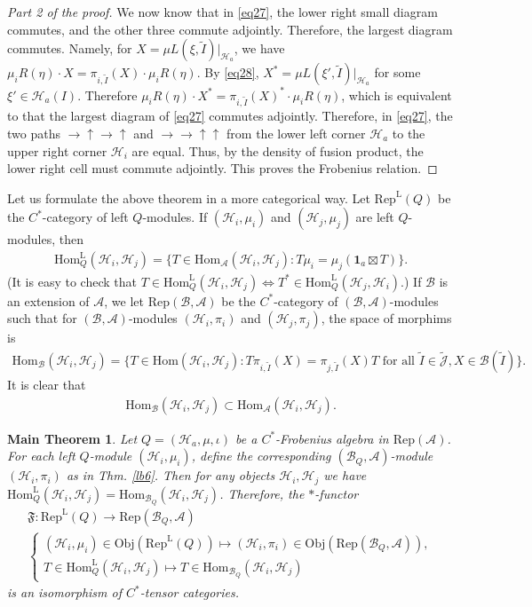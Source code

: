 \documentclass[11pt,b5paper,notitlepage]{article}
\theoremstyle{definition}
\theoremstyle{plain}
\newtheorem{Mthm}{Main Theorem}
\newcommand{\fk}{\mathfrak}
\newcommand{\mc}{\mathcal}
\newcommand{\wtd}{\widetilde}
\newcommand{\id}{\mathbf{1}}
\newcommand{\Hom}{\mathrm{Hom}}
\newcommand{\Rep}{\mathrm{Rep}}
\newcommand{\Jtd}{\widetilde{\mathcal J}}
\newcommand{\RepA}{\mathrm{Rep}(\mathcal A)}
\newcommand{\RepL}{\mathrm{Rep}^{\mathrm{L}}}
\newcommand{\HomL}{\mathrm{Hom}^{\mathrm{L}}}
\newcommand{\Obj}{\mathrm{Obj}}
\numberwithin{equation}{section}
\begin{document}
\begin{proof}[Part 2 of the proof]
We now know that in \eqref{eq27}, the lower right small diagram commutes, and the other three commute adjointly. Therefore, the largest diagram commutes. Namely, for $X=\mu L(\xi,\wtd I)|_{\mc H_a}$, we have $\mu_iR(\eta)\cdot  X=\pi_{i,\wtd I}(X)\cdot \mu_iR(\eta)$. By \eqref{eq28}, $X^*=\mu L(\xi',\wtd I)|_{\mc H_a}$ for some $\xi'\in\mc H_a(I)$. Therefore  $\mu_iR(\eta)\cdot X^*=\pi_{i,\wtd I}(X)^*\cdot \mu_iR(\eta)$, which is equivalent to that the largest diagram of \eqref{eq27} commutes adjointly. Therefore, in \eqref{eq27},  the two paths $\rightarrow \uparrow \rightarrow\uparrow$ and $\rightarrow \rightarrow \uparrow \uparrow$ from the lower left corner $\mc H_a$  to the upper right corner $\mc H_i$ are equal. Thus, by the density of fusion product, the lower right cell must commute adjointly. This proves the Frobenius relation.
\end{proof}


Let us formulate the above theorem in a more categorical way. Let $\RepL(Q)$ be the $C^*$-category of left $Q$-modules. If $(\mc H_i,\mu_i)$ and $(\mc H_j,\mu_j)$ are left $Q$-modules, then 
\begin{align*}
\HomL_Q(\mc H_i,\mc H_j)=\{T\in\Hom_{\mc A}(\mc H_i,\mc H_j):T\mu_i=\mu_j(\id_a\boxtimes T)\}.
\end{align*}
(It is easy to check that $T\in\HomL_Q(\mc H_i,\mc H_j)\Leftrightarrow T^*\in\HomL_Q(\mc H_j,\mc H_i)$.) If $\mc B$ is an extension of $\mc A$, we let $\Rep(\mc B,\mc A)$ be the $C^*$-category of $(\mc B,\mc A)$-modules such that for $(\mc B,\mc A)$-modules $(\mc H_i,\pi_i)$ and $(\mc H_j,\pi_j)$, the space of morphims is 
\begin{align*}
\Hom_{\mc B}(\mc H_i,\mc H_j)=\{T\in\Hom(\mc H_i,\mc H_j):T\pi_{i,\wtd I}(X)=\pi_{j,\wtd I}(X)T\text{ for all }\wtd I\in\Jtd,X\in\mc B(\wtd I)\}.	
\end{align*} 
It is clear that
\begin{align*}
\Hom_{\mc B}(\mc H_i,\mc H_j)\subset \Hom_{\mc A}(\mc H_i,\mc H_j).	
\end{align*}



\begin{Mthm}\label{lb12}
Let $Q=(\mc H_a,\mu,\iota)$ be a $C^*$-Frobenius algebra in $\RepA$. For each left $Q$-module $(\mc H_i,\mu_i)$, define the corresponding $(\mc B_Q,\mc A)$-module $(\mc H_i,\pi_i)$ as in Thm. \ref{lb6}. Then for any objects $\mc H_i,\mc H_j$ we have $\HomL_Q(\mc H_i,\mc H_j)=\Hom_{\mc B_Q}(\mc H_i,\mc H_j)$. Therefore, the $*$-functor 
\begin{gather*}
	\fk F:\RepL(Q)\rightarrow\Rep(\mc B_Q,\mc A)\\
	\left\{
\begin{array}{l}
(\mc H_i,\mu_i)\in\Obj(\RepL(Q))\mapsto (\mc H_i,\pi_i)\in\Obj(\Rep(\mc B_Q,\mc A)),\\[1ex]
T\in\HomL_Q(\mc H_i,\mc H_j)\mapsto  T\in\Hom_{\mc B_Q}(\mc H_i,\mc H_j)		
\end{array}	
	\right.
\end{gather*}
is an isomorphism of $C^*$-tensor categories.
\end{Mthm}
\end{document}
